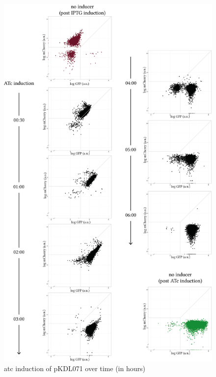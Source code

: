 \begin{figure}[tb]
	\begin{center}
\includegraphics[scale=0.7]{../../chapters/chapterABCFlow/images/pKDL071_atc_time.png}
\caption[\acrshort{atc} induction of pKDL071 over time]{\label{fig:switch_timecourse_atc} \acrshort{atc} induction of pKDL071 over time (in  hours)}
\end{center}
\end{figure}


